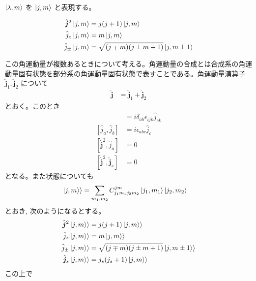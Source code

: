 \documentclass[uplatex,dvipdfmx,a4paper,11pt]{jlreq}
\theoremstyle{definition}
\begin{document}
\begin{definition}
  $\ket{\lambda, m}$ を $\ket{j, m}$ と表現する。
\end{definition}

\begin{proposition}
  \begin{align}
    \hat{\bm{j}}^2\ket{j, m} & = j(j + 1)\ket{j, m}                          \\
    \hat{j}_z\ket{j, m}      & = m\ket{j, m}                                 \\
    \hat{j}_\pm\ket{j, m}    & = \sqrt{(j \mp m)(j \pm m + 1)}\ket{j, m\pm1}
  \end{align}
\end{proposition}


この角運動量が複数あるときについて考える。角運動量の合成とは合成系の角運動量固有状態を部分系の角運動量固有状態で表すことである。角運動量演算子 $\hat{\bm{j}}_1, \hat{\bm{j}}_2$ について
\begin{align}
  \hat{\bm{j}} & = \hat{\bm{j}}_1 + \hat{\bm{j}}_2
\end{align}
とおく。このとき
\begin{align}
  [\hat{j}_{a,i}, \hat{j}_{b,j}]   & = i\delta_{ab}\epsilon_{ijk}\hat{j}_{ck} \\
  [\hat{j}_a, \hat{j}_b]           & = i\epsilon_{abc}\hat{j}_c               \\
  [\hat{\bm{j}}^2, \hat{j}_a]      & = 0                                      \\
  [\hat{\bm{j}}^2, \hat{\bm{j}}_s] & = 0
\end{align}
となる。また状態についても
\begin{align}
  \ket{j, m}\rangle & = \sum_{m_1, m_2}C_{j_1m_1j_2m_2}^{jm}\ket{j_1, m_1}\ket{j_2, m_2}
\end{align}
とおき, 次のようになるとする。
\begin{align}
  \hat{\bm{j}}^2\ket{j, m}\rangle & = j(j+1)\ket{j, m}\rangle                           \\
  \hat{j}_z\ket{j, m}\rangle      & = m\ket{j, m}\rangle                                \\
  \hat{j}_\pm\ket{j, m}\rangle    & = \sqrt{(j\mp m)(j\pm m + 1)}\ket{j, m\pm 1}\rangle \\
  \hat{\bm{j}}_s\ket{j, m}\rangle & = j_s(j_s + 1)\ket{j, m}\rangle
\end{align}
この上で
\end{document}
